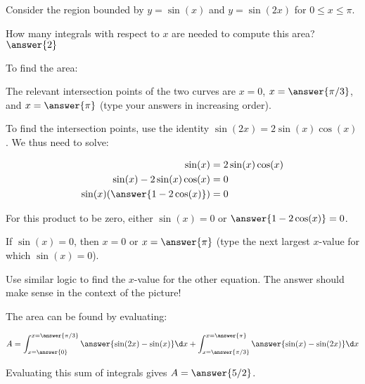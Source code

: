 \documentclass{ximera}
\author{Jim Talamo and Alex Beckwith}
\begin{document}
\begin{exercise}
	Consider the region bounded by $y=\sin(x)$ and $y=\sin(2x)$ for $0 \leq x \leq \pi$.
	\begin{image}
	\end{image}
	
How many integrals with respect to $x$ are needed to compute this area? $\answer{2}$
	
To find the area:
	
The relevant intersection points of the two curves are $x= 0$, $x= \answer{\pi/3}$, and $x= \answer{\pi}$ (type your answers in increasing order).
	
	\begin{hint}
	To find the intersection points, use the identity $\sin(2x) = 2 \sin(x) \cos(x)$.  We thus need to solve:
	
\begin{align*}
\sin(x) &= 2 \sin(x) \cos(x) \\
\sin(x) - 2 \sin(x) \cos(x) &=0 \\
\sin(x) (\answer{1-2 \cos(x)}) &=0
\end{align*}

For this product to be zero, either $\sin(x) = 0$ or $\answer{1-2 \cos(x)} =0$.

If $\sin(x) =0$, then $x=0$ or $x = \answer{\pi}$ (type the next largest $x$-value for which $\sin(x) =0$).

Use similar logic to find the $x$-value for the other equation.  The answer should make sense in the context of the picture!

\end{hint}

The area can be found by evaluating:

\[
A= \int_{x= \answer{0}}^{x= \answer{\pi/3}} \answer{\sin(2x) - \sin(x)} \d x + \int_{x= \answer{\pi/3}}^{x= \answer{\pi}} \answer{\sin(x) - \sin(2x)} \d x
\]

Evaluating this sum of integrals gives $A = \answer{5/2}$.	
\end{exercise}
\end{document}
